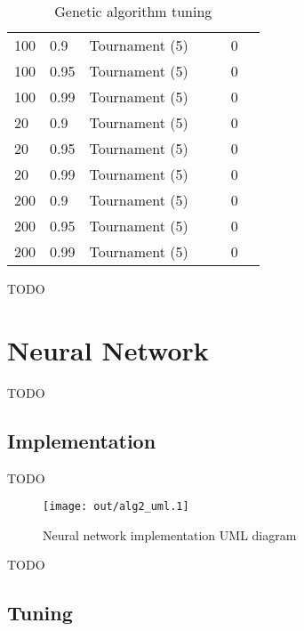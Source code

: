 \documentclass[a4paper]{article}
\begin{document}
\begin{table}[h!]
\begin{tabular}{@{}lllllll@{}}
    100             & 0.9        & Tournament (5)   &          &        & 0                 &    \\
    100             & 0.95       & Tournament (5)   &          &        & 0                 &    \\
    100             & 0.99       & Tournament (5)   &          &        & 0                 &    \\
    20              & 0.9        & Tournament (5)   &          &        & 0                 &    \\
    20              & 0.95       & Tournament (5)   &          &        & 0                 &    \\
    20              & 0.99       & Tournament (5)   &          &        & 0                 &    \\
    200             & 0.9        & Tournament (5)   &          &        & 0                 &    \\
    200             & 0.95       & Tournament (5)   &          &        & 0                 &    \\
    200             & 0.99       & Tournament (5)   &          &        & 0                 &    \\
    \bottomrule
  \end{tabular}
  \caption{Genetic algorithm tuning}
  \label{tab:ga_tuning}
\end{table}

TODO

\section{Neural Network}

TODO

\subsection{Implementation}

TODO

\begin{figure}[h!]
  \centering
  \texttt{[image: out/alg2\_uml.1]}
  \caption{Neural network implementation UML diagram}
  \label{fig:alg2_uml}
\end{figure}

TODO

\subsection{Tuning}
\end{document}
